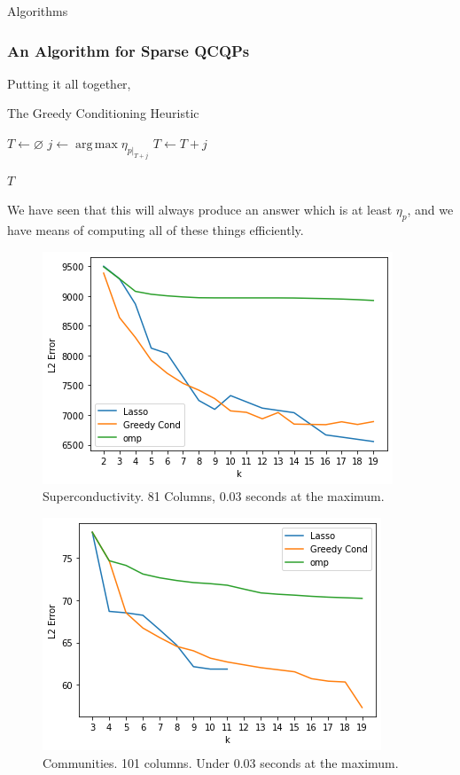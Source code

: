 \documentclass{beamer}
\DeclareMathOperator*{\argmax}{arg\,max}
\begin{document}
\begin{frame}
    \centering
    \huge
    {\color{gray}Algorithms}
\end{frame}
\begin{frame}
    \frametitle{An Algorithm for Sparse QCQPs}
    Putting it all together,
    \begin{algorithm}[H]
    \caption{The Greedy Conditioning Heuristic}
    \label{alg:greedy}
    \begin{algorithmic}
        \State $T \gets \varnothing$
            \State $j \gets \argmax \eta_{p|_{T + j}}$
            \State $T \gets T + j$
        \EndFor

        \Return $T$
    \end{algorithmic}
    \end{algorithm}

    We have seen that this will always produce an answer which is at least $\eta_p$, and we have means of computing all of these things efficiently.
\end{frame}
\begin{frame}
    \begin{figure}[h]
        \centering
        \includegraphics[width=0.8\linewidth]{superconductivity.png}
        \caption{Superconductivity. 81 Columns, 0.03 seconds at the maximum.}%
        \label{fig:superconductivity}
    \end{figure}
\end{frame}
\begin{frame}
    \begin{figure}[h]
        \centering
        \includegraphics[width=0.8\linewidth]{violentcrime.png}
        \caption{Communities. 101 columns. Under 0.03 seconds at the maximum.}%
        \label{fig:name}
    \end{figure}
\end{frame}
\end{document}
